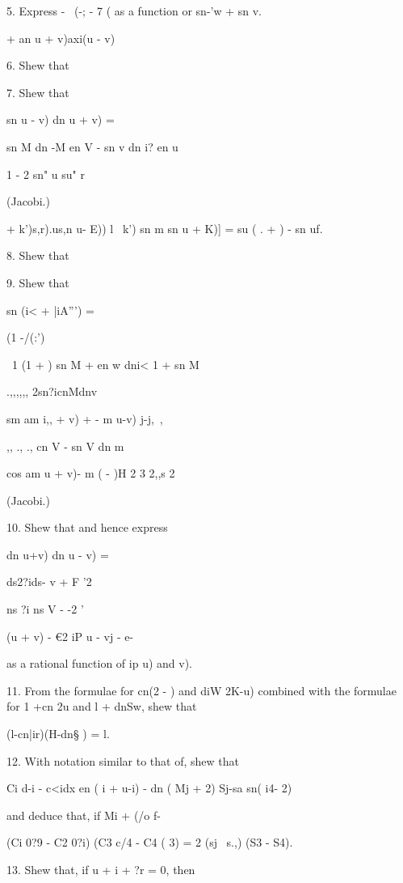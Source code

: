 5. Express - \ (-; - 7 ( as a function or sn-'w + sn v.

   + an u + v)axi(u - v)

6. Shew that

7. Shew that

sn u - v) dn u + v) =

sn M dn -M en V - sn v dn i? en u

1 - 2 sn" u su" r

(Jacobi.)

    + k')s,r).us,n u- E)) l~ k') sn m sn u + K)] = su ( . + ) - sn uf.


8. Shew that

9. Shew that

sn (i< + |iA''') =

(1 -/(:')

\ 1 (1 + ) sn M + en w dni< 1 + sn M

.,,,,,, 2sn?icnMdnv

sm am i,, + v) + - m u-v) j-j,~,

,, ., ., cn V - sn V dn m

cos am u + v)- m ( - )H 2 3 2,,s 2 

(Jacobi.)

10. Shew that and hence express

dn u+v) dn u - v) =

ds2?ids- v + F '2

ns ?i ns V - -2 '

(u + v) - €2 iP u - vj - e-

as a rational function of ip u) and v). 

11. From the formulae for cn(2 - ) and diW 2K-u) combined with the
formulae for 1 +cn 2u and l + dnSw, shew that

(l-cn|ir)(H-dn§ ) = l. 

12. With notation similar to that of, shew that

Ci d-i - c<idx en ( i + u-i) - dn ( Mj + 2) Sj-sa sn( i4- 2)

and deduce that, if Mi + (/o f-%

(Ci 0?9 - C2 0?i) (C3 c/4 - C4 ( 3) = 2 (sj \ s.,) (S3 - S4).


13. Shew that, if u + i + ?r = 0, then

